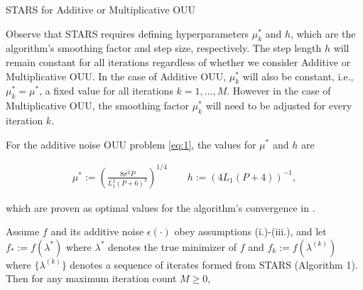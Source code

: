 \documentclass{amsart}
\begin{document}
\vspace{.25cm}


\begin{algorithm}[H]

\SetAlgoLined

 


	\caption{STARS for Additive or Multiplicative OUU}

\end{algorithm}

\vspace{.25cm}

\noindent Observe that STARS requires defining hyperparameters $\mu^*_k$ and $h$, which are the algorithm's smoothing factor and step size, respectively. The step length $h$ will remain constant for all iterations regardless of whether we consider Additive or Multiplicative OUU. In the case of Additive OUU, $\mu^*_k$ will also be constant, i.e., $\mu^*_k=\mu^*$, a fixed value for all iterations $k=1, \ldots, M$. However in the case of Multiplicative OUU, the smoothing factor $\mu^*_k$ will need to be adjusted for every iteration $k$.  

For the additive noise OUU problem \eqref{eq:1}, the values for $\mu^*$ and $h$ are 

\begin{eqnarray} \label{eq:9}
\mu^*:=\left( \frac{8\sigma^2 P}{L_1^2(P+6)^3}\right)^{1/4} \quad \quad h:=(4L_1(P+4))^{-1},
\end{eqnarray} 

\noindent which are proven as optimal values for the algorithm's convergence in \cite{CW}. 

Assume $f$ and its additive noise $\epsilon(\cdot)$ obey assumptions (i.)-(iii.), and let $f_*:=f(\lambda^*)$ where $\lambda^*$ denotes the true minimizer of $f$ and $f_k:=f(\lambda^{(k)})$ where $\{\lambda^{(k)}\}$ denotes a sequence of iterates formed from STARS (Algorithm 1). Then for any maximum iteration count $M \geq 0$,
\end{document}
